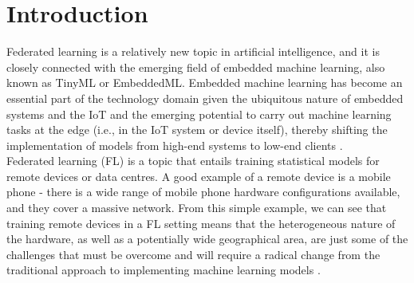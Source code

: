 \documentclass[conference]{IEEEtran}
\begin{document}
\section{Introduction}
Federated learning is a relatively new topic in artificial intelligence, and it is closely connected with the emerging field of embedded machine learning, also known as TinyML or EmbeddedML. Embedded machine learning has become an essential part of the technology domain given the ubiquitous nature of embedded systems and the IoT and the emerging potential to carry out machine learning tasks at the edge (i.e., in the IoT system or device itself), thereby shifting the implementation of models from high-end systems to low-end clients \cite{b1}. \\
Federated learning (FL) is a topic that entails training statistical models for remote devices or data centres. A good example of a remote device is a mobile phone - there is a wide range of mobile phone hardware configurations available, and they cover a massive network. From this simple example, we can see that training remote devices in a FL setting means that the heterogeneous nature of the hardware, as well as a potentially wide geographical area, are just some of the challenges that must be overcome and will require a radical change from the traditional approach to implementing machine learning models \cite{b2}. \\
\end{document}
